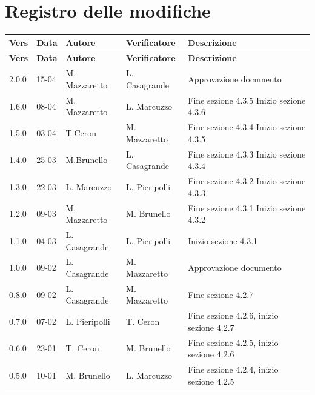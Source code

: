 \section*{Registro delle modifiche}

\renewcommand{\arraystretch}{1.15}
\begin{longtable}{|p{}|p{}|p{}|p{}|p{}|}
    \hline
    \rowcolor[gray]{0.9}
    \textbf{Vers} & \textbf{Data} & \textbf{Autore} & \textbf{Verificatore} & \textbf{Descrizione} \\
    \hline
    \endfirsthead
    
    \hline
    \rowcolor[gray]{0.9}
    \textbf{Vers} & \textbf{Data} & \textbf{Autore} & \textbf{Verificatore} & \textbf{Descrizione} \\
    \hline
		\endhead
		2.0.0 & 15-04 & M. Mazzaretto & L. Casagrande & Approvazione documento \\
		\hline
		1.6.0 & 08-04 & M. Mazzaretto & L. Marcuzzo & Fine sezione 4.3.5 \newline Inizio sezione 4.3.6 \\
		\hline
		1.5.0 & 03-04 & T.Ceron & M. Mazzaretto & Fine sezione 4.3.4 \newline Inizio sezione 4.3.5 \\ 
		\hline
		1.4.0 & 25-03 & M.Brunello & L. Casagrande & Fine sezione 4.3.3 \newline Inizio sezione 4.3.4 \\
    	\hline
		1.3.0 & 22-03 & L. Marcuzzo & L. Pieripolli & Fine sezione 4.3.2 \newline Inizio sezione 4.3.3 \\
    	\hline
    	1.2.0 & 09-03 & M. Mazzaretto & M. Brunello & Fine sezione 4.3.1 \newline Inizio sezione 4.3.2 \\
    	\hline
		1.1.0 & 04-03 & L. Casagrande & L. Pieripolli & Inizio sezione 4.3.1 \\
		\hline
		1.0.0 & 09-02 & L. Casagrande & M. Mazzaretto & Approvazione documento \\
		\hline
		0.8.0 & 09-02 & L. Casagrande & M. Mazzaretto & Fine sezione 4.2.7 \\
		\hline
		0.7.0 & 07-02 & L. Pieripolli & T. Ceron & Fine sezione 4.2.6, inizio sezione 4.2.7\\
		\hline
		0.6.0 & 23-01 & T. Ceron & M. Brunello & Fine sezione 4.2.5, inizio sezione 4.2.6\\
		\hline
		0.5.0 & 10-01 & M. Brunello & L. Marcuzzo & Fine sezione 4.2.4, inizio sezione 4.2.5\\

\end{longtable}
